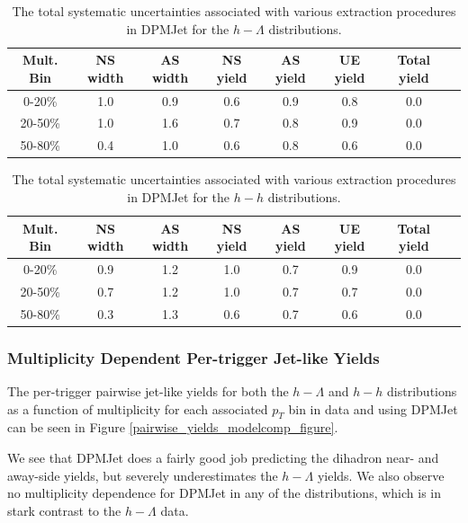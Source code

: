 \begin{table}[ht]
\centering
\begin{tabular}{|c||c|c|c|c|c|c|c|}
\hline
Mult. Bin & NS width & AS width & NS yield & AS yield & UE yield  & Total yield \\
\hline
0-20\% &  1.0 & 0.9 & 0.6 & 0.9 & 0.8 & 0.0 \\
20-50\% &  1.0 & 1.6 & 0.7 & 0.8 & 0.9 & 0.0 \\
50-80\% &  0.4 & 1.0 & 0.6 & 0.8 & 0.6 & 0.0 \\
\hline
\end{tabular}
\caption{The total systematic uncertainties associated with various extraction procedures in DPMJet for the $h-\Lambda$ distributions.}
\label{dpmjet_systematics_table_lambda}
\end{table}

\begin{table}[ht]
\centering
\begin{tabular}{|c||c|c|c|c|c|c|c|}
\hline
Mult. Bin & NS width & AS width & NS yield & AS yield & UE yield  & Total yield \\
\hline
0-20\% &  0.9 & 1.2 & 1.0 & 0.7 & 0.9 & 0.0 \\
20-50\% &  0.7 & 1.2 & 1.0 & 0.7 & 0.7 & 0.0 \\
50-80\% &  0.3 & 1.3 & 0.6 & 0.7 & 0.6 & 0.0 \\
\hline
\end{tabular}
\caption{The total systematic uncertainties associated with various extraction procedures in DPMJet for the $h-h$ distributions.}
\label{dpmjet_systematics_table_h}
\end{table}

\subsubsection{Multiplicity Dependent Per-trigger Jet-like Yields}
\label{pairwise_yields_modelcomp}
The per-trigger pairwise jet-like yields for both the $h-\Lambda$ and $h-h$ distributions  as a function of multiplicity for each associated $p_{T}$ bin in data and using DPMJet can be seen in Figure \ref{pairwise_yields_modelcomp_figure}.

We see that DPMJet does a fairly good job predicting the dihadron near- and away-side yields, but severely underestimates the $h-\Lambda$ yields. We also observe no multiplicity dependence for DPMJet in any of the distributions, which is in stark contrast to the $h-\Lambda$ data.

